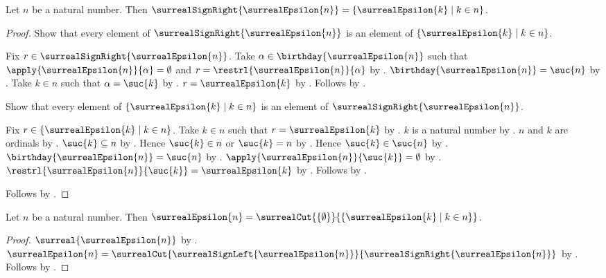 \begin{proposition}\label{surreal_epsilon_sign_right}
    Let $n$ be a natural number.
    Then $\surrealSignRight{\surrealEpsilon{n}}=
        \{\surrealEpsilon{k}\mid k\in n\}$.
\end{proposition}
\begin{proof}
    Show that every element of $\surrealSignRight{\surrealEpsilon{n}}$
        is an element of $\{\surrealEpsilon{k}\mid k\in n\}$.
    \begin{subproof}
        Fix $r\in\surrealSignRight{\surrealEpsilon{n}}$.
        Take $\alpha\in\birthday{\surrealEpsilon{n}}$ such that
            $\apply{\surrealEpsilon{n}}{\alpha}=\emptyset$ and
            $r=\restrl{\surrealEpsilon{n}}{\alpha}$
            by .
        $\birthday{\surrealEpsilon{n}}=\suc{n}$
            by .
        Take $k\in n$ such that $\alpha=\suc{k}$
            by .
        $r=\surrealEpsilon{k}$
            by .
        Follows by .
    \end{subproof}
    Show that every element of $\{\surrealEpsilon{k}\mid k\in n\}$
        is an element of $\surrealSignRight{\surrealEpsilon{n}}$.
    \begin{subproof}
        Fix $r\in\{\surrealEpsilon{k}\mid k\in n\}$.
        Take $k\in n$ such that $r=\surrealEpsilon{k}$
            by .
        $k$ is a natural number
            by .
        $n$ and $k$ are ordinals by .
        $\suc{k}\subseteq n$ by .
        Hence $\suc{k}\in n$ or $\suc{k}=n$
            by .
        Hence $\suc{k}\in\suc{n}$ by .
        $\birthday{\surrealEpsilon{n}}=\suc{n}$
            by .
        $\apply{\surrealEpsilon{n}}{\suc{k}}=\emptyset$
            by .
        $\restrl{\surrealEpsilon{n}}{\suc{k}}
            =\surrealEpsilon{k}$
            by .
        Follows by .
    \end{subproof}
    Follows by .
\end{proof}

\begin{theorem}\label{surreal_epsilon_cut_equation}
    Let $n$ be a natural number.
    Then $\surrealEpsilon{n}=
        \surrealCut{\{\emptyset\}}
            {\{\surrealEpsilon{k}\mid k\in n\}}$.
\end{theorem}
\begin{proof}
    $\surreal{\surrealEpsilon{n}}$
        by .
    $\surrealEpsilon{n}=\surrealCut
        {\surrealSignLeft{\surrealEpsilon{n}}}
        {\surrealSignRight{\surrealEpsilon{n}}}$
        by .
    Follows by
        .
\end{proof}

